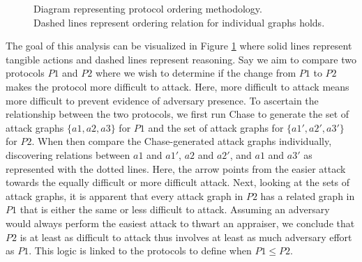 \documentclass[runningheads]{llncs}
\theoremstyle{definition}
\begin{document}



\begin{figure}[hbtp]
    \centering
    \captionsetup{justification=centering,margin=1cm}
    
    \caption[Protocol ordering abstraction]{Diagram representing protocol ordering methodology. \\ Dashed lines represent ordering relation for individual graphs holds. }
    \label{fig:protocol-org-fig}
\end{figure}

The goal of this analysis can be visualized in Figure \ref{fig:protocol-org-fig} where solid lines represent tangible actions and dashed lines represent reasoning. Say we aim to compare two protocols $P1$ and $P2$ where we wish to determine if the change from $P1$ to $P2$ makes the protocol more difficult to attack. Here, more difficult to attack means more difficult to prevent evidence of adversary presence. To ascertain the relationship between the two protocols, we first run Chase to generate the set of attack graphs $\{ a1, a2, a3\}$ for $P1$ and the set of attack graphs for $\{a1', a2', a3'\}$ for $P2$. When then compare the Chase-generated attack graphs individually, discovering relations between $a1$ and $a1'$, $a2$ and $a2'$, and $a1$ and $a3'$ as represented with the dotted lines. Here, the arrow points from the easier attack towards the equally difficult or more difficult attack. Next, looking at the sets of attack graphs, it is apparent that every attack graph in $P2$ has a related graph in $P1$ that is either the same or less difficult to attack. Assuming an adversary would always perform the easiest attack to thwart an appraiser, we conclude that $P2$ is at least as difficult to attack thus involves at least as much adversary effort as $P1$. This logic is linked to the protocols to define when $ P1 \leq P2$.  
\end{document}
